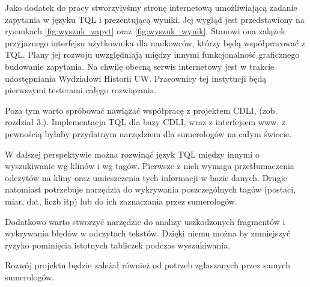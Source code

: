 Jako dodatek do pracy stworzyłyśmy stronę internetową umożliwiającą zadanie zapytania w języku TQL i prezentującą wyniki. 
Jej wygląd jest przedstawiony na rysunkach \ref{fig:wyszuk_zapyt} oraz \ref{fig:wyszuk_wynik}.
Stanowi ona zalążek przyjaznego interfejsu użytkownika dla naukowców, którzy będą współpracować z TQL. Plany jej rozwoju
uwzględniają między innymi funkcjonalność graficznego budowanie zapytania.
Na chwilę obecną serwis internetowy jest w trakcie udostępniania Wydziałowi Historii UW.
Pracownicy tej instytucji będą pierwszymi testerami całego rozwiązania.

Poza tym warto spróbować nawiązać współpracę z projektem CDLI, (zob. rozdział 3.).
Implementacja TQL dla bazy CDLI, wraz z interfejsem www, z pewnością byłaby przydatnym narzędziem dla sumerologów na całym świecie.

W dalszej perspektywie można rozwinąć język TQL między innymi o wyszukiwanie wg klinów i wg tagów. 
Pierwsze z nich wymaga przetłumaczenia odczytów na kliny oraz umieszczenia tych informacji w bazie danych.
Drugie natomiast potrzebuje narzędzia do wykrywania poszczególnych tagów
(postaci, miar, dat, liczb itp) lub do ich zaznaczania przez sumerologów.

Dodatkowo warto stworzyć narzędzie do analizy uszkodzonych fragmentów i wykrywania błędów w odczytach tekstów. 
Dzięki niemu można by zmniejszyć ryzyko pominięcia istotnych tabliczek podczas wyszukiwania. 

Rozwój projektu będzie zależał również od potrzeb zgłaszanych przez samych sumerologów.
